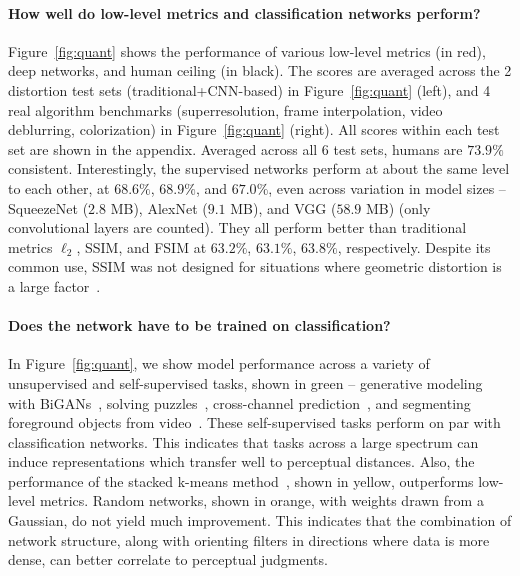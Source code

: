 \paragraph{How well do low-level metrics and classification networks perform?} Figure~\ref{fig:quant} shows the performance of various low-level metrics (in red), deep networks, and human ceiling (in black). The scores are averaged across the 2 distortion test sets (traditional+CNN-based) in Figure~\ref{fig:quant} (left), and 4 real algorithm benchmarks (superresolution, frame interpolation, video deblurring, colorization) in Figure~\ref{fig:quant} (right). All scores within each test set are shown in the appendix. Averaged across all 6 test sets, humans are $73.9\%$ consistent. Interestingly, the supervised networks perform at about the same level to each other, at $68.6\%$, $68.9\%$, and $67.0\%$, even across variation in model sizes -- SqueezeNet ($2.8$ MB), AlexNet ($9.1$ MB), and VGG ($58.9$ MB) (only convolutional layers are counted). They all perform better than traditional metrics $\ell_2$, SSIM, and FSIM at $63.2\%$, $63.1\%$, $63.8\%$, respectively. Despite its common use, SSIM was not designed for situations where geometric distortion is a large factor~\cite{sampat2009complex}.

\paragraph{Does the network have to be trained on classification?} In Figure~\ref{fig:quant}, we show model performance across a variety of unsupervised and self-supervised tasks, shown in green -- generative modeling with BiGANs~\cite{donahue2016adversarial}, solving puzzles~\cite{noroozi2016unsupervised}, cross-channel prediction~\cite{zhang2017split}, and segmenting foreground objects from video~\cite{pathak2017learning}. These self-supervised tasks perform on par with classification networks. This indicates that tasks across a large spectrum can induce representations which transfer well to perceptual distances. Also, the performance of the stacked k-means method~\cite{krahenbuhl2015data}, shown in yellow, outperforms low-level metrics. Random networks, shown in orange, with weights drawn from a Gaussian, do not yield much improvement. This indicates that the combination of network structure, along with orienting filters in directions where data is more dense, can better correlate to perceptual judgments.



